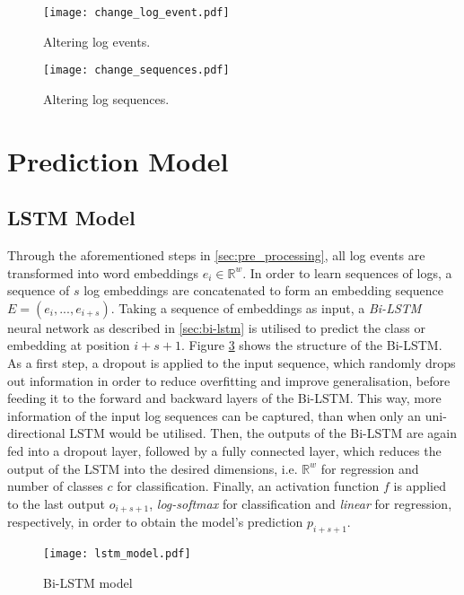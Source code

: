 \begin{figure}[H]
	\centering
	\texttt{[image: change\_log\_event.pdf]}
	\caption{Altering log events.}
	\label{fig:changelogevent}
\end{figure}

\begin{figure}[H]
	\centering
	\texttt{[image: change\_sequences.pdf]}
	\caption{Altering log sequences.}
	\label{fig:changesequence}
\end{figure}




\section{Prediction Model\label{sec:prediction_model}}

\subsection{LSTM Model\label{sec:lstm-model}}
Through the aforementioned steps in \ref{sec:pre_processing}, all log events are transformed into word embeddings $e_i \in \mathbb{R}^w$. In order to learn sequences of logs, a sequence of $s$ log embeddings are concatenated to form an embedding sequence $E = (e_i,...,e_{i+s})$. Taking a sequence of embeddings as input, a \textit{Bi-LSTM} neural network as described in \ref{sec:bi-lstm} is utilised to predict the class or embedding at position $i+s+1$. Figure \ref{fig:lstm_model} shows the structure of the Bi-LSTM. As a first step, a dropout is applied to the input sequence, which randomly drops out information in order to reduce overfitting and improve generalisation, before feeding it to the forward and backward layers of the Bi-LSTM. This way, more information of the input log sequences can be captured, than when only an uni-directional LSTM would be utilised. Then, the outputs of the Bi-LSTM are again fed into a dropout layer, followed by a fully connected layer, which reduces the output of the LSTM into the desired dimensions, i.e. $\mathbb{R}^w$ for regression and number of classes $c$ for classification. Finally, an activation function $f$ is applied to the last output $o_{i+s+1}$, \textit{log-softmax} for classification and \textit{linear} for regression, respectively, in order to obtain the model's prediction $p_{i+s+1}$.


\begin{figure}[H]
	\centering	
	\texttt{[image: lstm\_model.pdf]}
	\caption{Bi-LSTM model}
	\label{fig:lstm_model}
\end{figure}
\newpage
